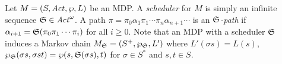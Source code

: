 Let $M = (S, \mathit{Act}, \wp, L)$ be an MDP. A
\emph{scheduler} for $M$ is simply an infinite sequence  $\mathfrak{S}\in \mathit{Act}^\omega$.
A path $\pi =
\pi_0 \alpha_1 \pi_1 \cdots \pi_n \alpha_{n+1} \cdots$ is an
\emph{$\mathfrak{S}$-path} if $\alpha_{i+1} = \mathfrak{S}(\pi_0
\pi_1 \cdots \pi_i)$ for all $i \geq 0$.
Note that an MDP with a
scheduler $\mathfrak{S}$ induces a Markov chain $M_{\mathfrak{S}} =
(S^+, \wp_{\mathfrak{S}}, L')$ where $L' (\sigma s) = L (s)$,
$\wp_{\mathfrak{S}} (\sigma s, \sigma s t) = \wp (s,
\mathfrak{S}(\sigma s), t)$ for $\sigma \in S^*$ and $s, t \in S$.

